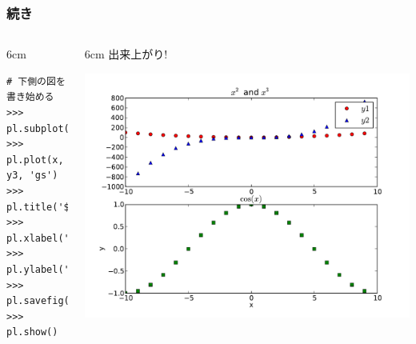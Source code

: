 \begin{frame}[t,fragile]
\frametitle{続き}
\begin{columns}
\begin{column}{6cm}
\begin{lstlisting}
# 下側の図を書き始める
>>> pl.subplot(212)        
>>> pl.plot(x, y3, 'gs')
>>> pl.title('$\cos(x)$')
>>> pl.xlabel('x')
>>> pl.ylabel('y')
>>> pl.savefig('x3.pdf') 
>>> pl.show()
\end{lstlisting}
\end{column}
\begin{column}{6cm}
出来上がり!
\begin{center}
\includegraphics[width=\textwidth]{x3.pdf}
\end{center}
\end{column}
\end{columns}
\end{frame}

